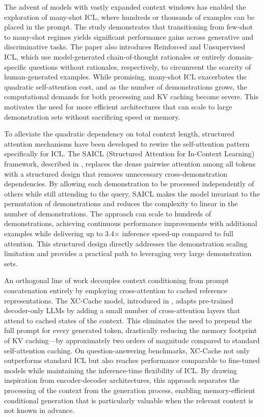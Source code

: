 \documentclass[11pt]{article}
\begin{document}
The advent of models with vastly expanded context windows has enabled the exploration of many-shot ICL, where hundreds or thousands of examples can be placed in the prompt. The study \cite{ref101} demonstrates that transitioning from few-shot to many-shot regimes yields significant performance gains across generative and discriminative tasks. The paper also introduces Reinforced and Unsupervised ICL, which use model-generated chain-of-thought rationales or entirely domain-specific questions without rationales, respectively, to circumvent the scarcity of human-generated examples. While promising, many-shot ICL exacerbates the quadratic self-attention cost, and as the number of demonstrations grows, the computational demands for both processing and KV caching become severe. This motivates the need for more efficient architectures that can scale to large demonstration sets without sacrificing speed or memory.

To alleviate the quadratic dependency on total context length, structured attention mechanisms have been developed to rewire the self-attention pattern specifically for ICL. The SAICL (Structured Attention for In-Context Learning) framework, described in \cite{ref105}, replaces the dense pairwise attention among all tokens with a structured design that removes unnecessary cross-demonstration dependencies. By allowing each demonstration to be processed independently of others while still attending to the query, SAICL makes the model invariant to the permutation of demonstrations and reduces the complexity to linear in the number of demonstrations. The approach can scale to hundreds of demonstrations, achieving continuous performance improvements with additional examples while delivering up to 3.4× inference speed-up compared to full attention. This structured design directly addresses the demonstration scaling limitation and provides a practical path to leveraging very large demonstration sets.

An orthogonal line of work decouples context conditioning from prompt concatenation entirely by employing cross-attention to cached reference representations. The XC-Cache model, introduced in \cite{ref106}, adapts pre-trained decoder-only LLMs by adding a small number of cross-attention layers that attend to cached states of the context. This eliminates the need to prepend the full prompt for every generated token, drastically reducing the memory footprint of KV caching---by approximately two orders of magnitude compared to standard self-attention caching. On question-answering benchmarks, XC-Cache not only outperforms standard ICL but also reaches performance comparable to fine-tuned models while maintaining the inference-time flexibility of ICL. By drawing inspiration from encoder-decoder architectures, this approach separates the processing of the context from the generation process, enabling memory-efficient conditional generation that is particularly valuable when the relevant context is not known in advance.
\end{document}
